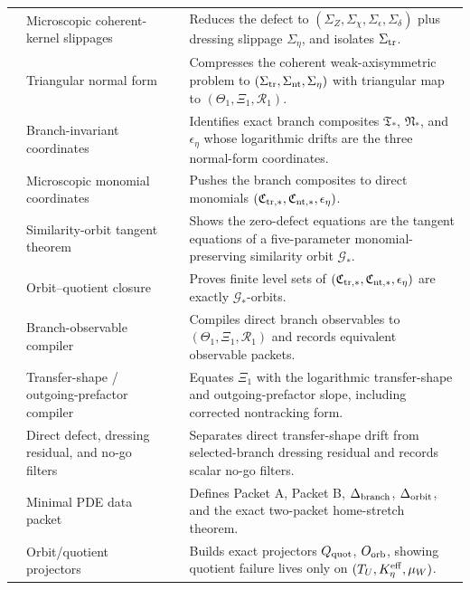 \begin{longtable}{@{}L{0.075\textwidth}L{0.34\textwidth}L{0.20\textwidth}L{0.33\textwidth}@{}}
 & Microscopic coherent-kernel slippages & \StatusExactClosure{} & Reduces the defect to \((\Sigma_Z,\Sigma_\chi,\Sigma_\epsilon,\Sigma_\delta)\) plus dressing slippage \(\Sigma_\eta\), and isolates \(\Sigma_{\rm tr}\). \\
 & Triangular normal form & \StatusExactClosure{} & Compresses the coherent weak-axisymmetric problem to \((\Sigma_{\rm tr},\Sigma_{\rm nt},\Sigma_\eta)\) with triangular map to \((\Theta_1,\Xi_1,\mathcal R_1)\). \\
 & Branch-invariant coordinates & \StatusExactClosure{} & Identifies exact branch composites \(\mathfrak T_*\), \(\mathfrak N_*\), and \(\epsilon_\eta\) whose logarithmic drifts are the three normal-form coordinates. \\
 & Microscopic monomial coordinates & \StatusExactClosure{} & Pushes the branch composites to direct monomials \((\mathfrak C_{{\rm tr},*},\mathfrak C_{{\rm nt},*},\epsilon_\eta)\). \\
 & Similarity-orbit tangent theorem & \StatusExactClosure{} & Shows the zero-defect equations are the tangent equations of a five-parameter monomial-preserving similarity orbit \(\mathcal G_*\). \\
 & Orbit--quotient closure & \StatusExactClosure{} & Proves finite level sets of \((\mathfrak C_{{\rm tr},*},\mathfrak C_{{\rm nt},*},\epsilon_\eta)\) are exactly \(\mathcal G_*\)-orbits. \\
 & Branch-observable compiler & \StatusExactClosure{} & Compiles direct branch observables to \((\Theta_1,\Xi_1,\mathcal R_1)\) and records equivalent observable packets. \\
 & Transfer-shape / outgoing-prefactor compiler & \StatusExactClosure{} & Equates \(\Xi_1\) with the logarithmic transfer-shape and outgoing-prefactor slope, including corrected nontracking form. \\
 & Direct defect, dressing residual, and no-go filters & \StatusExactClosure{} & Separates direct transfer-shape drift from selected-branch dressing residual and records scalar no-go filters. \\
 & Minimal PDE data packet & \StatusExactClosure{} & Defines Packet A, Packet B, \(\Delta_{\rm branch}\), \(\Delta_{\rm orbit}\), and the exact two-packet home-stretch theorem. \\
 & Orbit/quotient projectors & \StatusExactClosure{} & Builds exact projectors \(Q_{\rm quot}\), \(O_{\rm orb}\), showing quotient failure lives only on \((T_U,K_\eta^{\rm eff},\mu_W)\). \\

\end{longtable}
